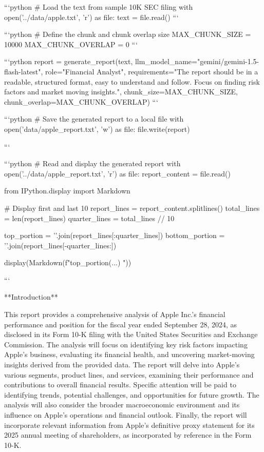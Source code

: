 {{```python
# Load the text from sample 10K SEC filing
with open('../data/apple.txt', 'r') as file:
    text = file.read()
```


```python
# Define the chunk and chunk overlap size
MAX_CHUNK_SIZE = 10000
MAX_CHUNK_OVERLAP = 0
```


```python
report = generate_report(text, llm_model_name="gemini/gemini-1.5-flash-latest", 
                           role="Financial Analyst", 
                           requirements="The report should be in a readable, structured format, easy to understand and follow. Focus on finding risk factors and market moving insights.",
                           chunk_size=MAX_CHUNK_SIZE, 
                           chunk_overlap=MAX_CHUNK_OVERLAP)
```


```python
# Save the generated report to a local file
with open('data/apple_report.txt', 'w') as file:
    file.write(report)

```


```python
# Read and display the generated report
with open('../data/apple_report.txt', 'r') as file:
    report_content = file.read()
    
from IPython.display import Markdown

# Display first and last 10%
report_lines = report_content.splitlines()
total_lines = len(report_lines)
quarter_lines = total_lines // 10

top_portion = '\n'.join(report_lines[:quarter_lines])
bottom_portion = '\n'.join(report_lines[-quarter_lines:])

display(Markdown(f"{top_portion}\n\n (...) \n{}"))

```


**Introduction**

This report provides a comprehensive analysis of Apple Inc.'s financial performance and position for the fiscal year ended September 28, 2024, as disclosed in its Form 10-K filing with the United States Securities and Exchange Commission.  The analysis will focus on identifying key risk factors impacting Apple's business, evaluating its financial health, and uncovering market-moving insights derived from the provided data.  The report will delve into Apple's various segments, product lines, and services, examining their performance and contributions to overall financial results.  Specific attention will be paid to identifying trends, potential challenges, and opportunities for future growth.  The analysis will also consider the broader macroeconomic environment and its influence on Apple's operations and financial outlook.  Finally, the report will incorporate relevant information from Apple's definitive proxy statement for its 2025 annual meeting of shareholders, as incorporated by reference in the Form 10-K.

}}
